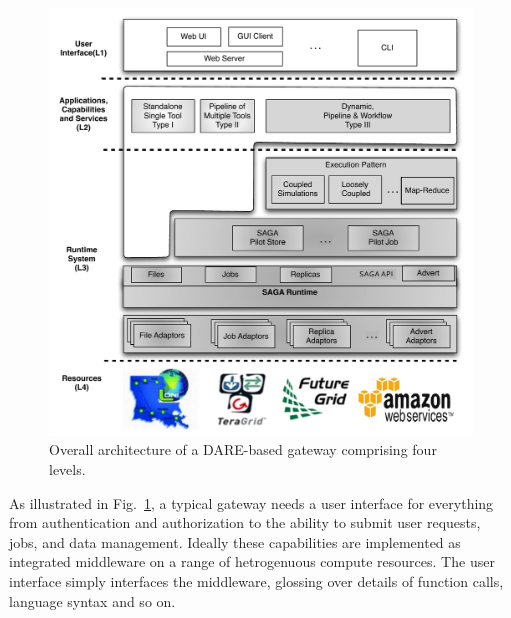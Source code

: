 \documentclass[]{svjour3}
\begin{document}
\begin{figure}
  \centering
  \includegraphics[scale=0.55]{figures/DARE-gateway-arch.pdf}
  \caption{\small {} Overall architecture of a DARE-based gateway comprising four levels. %
  }
  \label{fig:dare-arch} 
\end{figure}



As illustrated in Fig.~\ref{fig:dare-arch}, a typical gateway needs a
user interface for everything from authentication and authorization
to the ability to submit user requests, jobs, and data management. 
Ideally these capabilities are implemented as integrated middleware on
a range of hetrogenuous compute resources. The user interface simply
interfaces the middleware, glossing over details of function calls,
language syntax and so on.


\end{document}
